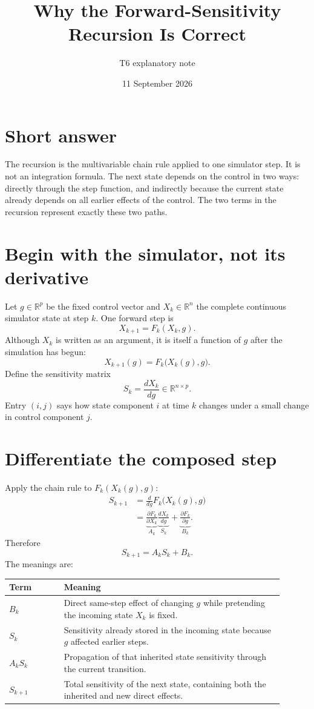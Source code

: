 \documentclass[10pt]{article}
\title{Why the Forward-Sensitivity Recursion Is Correct}
\author{T6 explanatory note}
\date{11 September 2026}
\newcommand{\R}{\mathbb{R}}
\begin{document}
\maketitle

\section*{Short answer}
The recursion is the multivariable chain rule applied to one simulator step. It is not an integration formula. The next state depends on the control in two ways: directly through the step function, and indirectly because the current state already depends on all earlier effects of the control. The two terms in the recursion represent exactly these two paths.

\section{Begin with the simulator, not its derivative}
Let $g\in\R^p$ be the fixed control vector and $X_k\in\R^n$ the complete continuous simulator state at step $k$. One forward step is
\[
  X_{k+1}=F_k(X_k,g).
\]
Although $X_k$ is written as an argument, it is itself a function of $g$ after the simulation has begun:
\[
  X_{k+1}(g)=F_k\bigl(X_k(g),g\bigr).
\]
Define the sensitivity matrix
\[
  S_k=\frac{dX_k}{dg}\in\R^{n\times p}.
\]
Entry $(i,j)$ says how state component $i$ at time $k$ changes under a small change in control component $j$.

\section{Differentiate the composed step}
Apply the chain rule to $F_k(X_k(g),g)$:
\[
\begin{aligned}
S_{k+1}
  &=\frac{d}{dg}F_k\bigl(X_k(g),g\bigr)\\
  &=\underbrace{\frac{\partial F_k}{\partial X_k}}_{A_k}
    \underbrace{\frac{dX_k}{dg}}_{S_k}
   +\underbrace{\frac{\partial F_k}{\partial g}}_{B_k}.
\end{aligned}
\]
Therefore
\[
  \boxed{S_{k+1}=A_kS_k+B_k.}
\]
The meanings are:

\begin{center}
\begin{tabular}{>{\raggedright\arraybackslash}p{0.18\linewidth}p{0.72\linewidth}}
\toprule
Term & Meaning \\
\midrule
$B_k$ & Direct same-step effect of changing $g$ while pretending the incoming state $X_k$ is fixed. \\
$S_k$ & Sensitivity already stored in the incoming state because $g$ affected earlier steps. \\
$A_kS_k$ & Propagation of that inherited state sensitivity through the current transition. \\
$S_{k+1}$ & Total sensitivity of the next state, containing both the inherited and new direct effects. \\
\bottomrule
\end{tabular}
\end{center}
\end{document}
